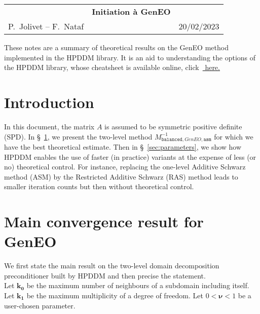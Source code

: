 \documentclass{article}
\begin{document}
\color{black}
\noindent
\begin{tabular}{lcr}
\hspace*{1.3cm}&\textbf{Initiation à GenEO}&\hspace*{1.3cm}
\\
P.~Jolivet -- F.~Nataf && 20/02/2023
\end{tabular}\par
\vspace*{1.5cm}
These notes are a summary of theoretical results on the GenEO method implemented in the HPDDM library. It is an aid to understanding the options of the HPDDM library, whose cheatsheet is available online, click~\href{https://github.com/hpddm/hpddm/blob/main/doc/cheatsheet.pdf}{ here.}\\


\section*{Introduction}

In this document, the matrix $A$ is assumed to be symmetric positive definite (SPD). In \S~\ref{sec:maincvresult}, we present the two-level method $M_{\texttt{balanced},GenEO,\texttt{asm}}^{-1}$ for which we have the best theoretical estimate. Then in \S~\ref{sec:parameters}, we show how HPDDM enables the use of faster (in practice) variants at the expense of less (or no) theoretical control. For instance, replacing the one-level Additive Schwarz method (ASM) by the Restricted Additive Schwarz (RAS) method leads to smaller iteration counts but then without theoretical control.   

\section{Main convergence result for GenEO}
   \label{sec:maincvresult}
We first state the main result on the two-level domain decomposition preconditioner built by HPDDM and then precise the statement.\\ 

Let $\boldsymbol{k_0}$ be the maximum number of neighbours of a subdomain including itself. %
 Let $\boldsymbol{k_1}$ be the maximum multiplicity of a degree of freedom. Let $0< \boldsymbol{\nu}<1$ be a user-chosen parameter.\\ 

\\
 
\end{document}

